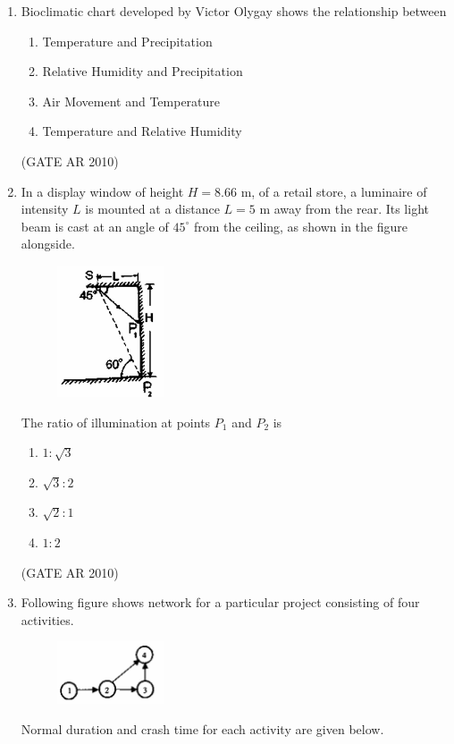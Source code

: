 \documentclass[journal]{IEEEtran}
\begin{document}
\begin{enumerate}
\item Bioclimatic chart developed by Victor Olygay shows the relationship between
\begin{multicols}{2}
\begin{enumerate}
\item Temperature and Precipitation
\item Relative Humidity and Precipitation
\item Air Movement and Temperature
\item Temperature and Relative Humidity
\end{enumerate}
\end{multicols}
\hfill (GATE AR 2010)

\item In a display window of height $H = 8.66$ m, of a retail store, a luminaire of intensity $L$ is mounted at a distance $L = 5$ m away from the rear. Its light beam is cast at an angle of $45^\circ$ from the ceiling, as shown in the figure alongside.
\begin{figure}[H]
\centering
\includegraphics[width=0.3\textwidth]{Fig 8.png}
\caption{}
\label{fig:question45}
\end{figure}
The ratio of illumination at points $P_1$ and $P_2$ is
\begin{multicols}{4}
\begin{enumerate}
\item $1: \sqrt{3}$
\item $\sqrt{3}: 2$
\item $\sqrt{2}: 1$
\item $1: 2$
\end{enumerate}
\end{multicols}
\hfill (GATE AR 2010)

\item Following figure shows network for a particular project consisting of four activities.
\begin{figure}[H]
\centering
\includegraphics[width=0.3\textwidth]{Fig 9.png}
\caption{}
\label{fig:question46}
\end{figure}
Normal duration and crash time for each activity are given below.


\end{enumerate}
\end{document}
